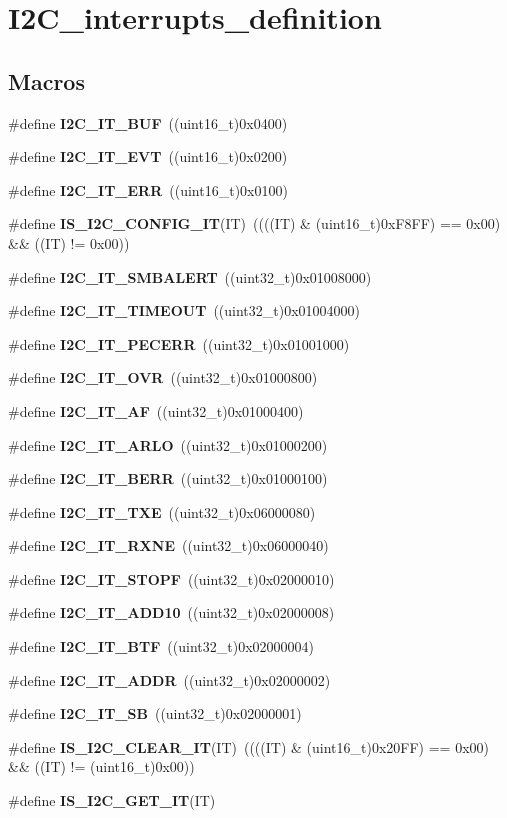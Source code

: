\section{I2\+C\+\_\+interrupts\+\_\+definition}
\label{group__I2C__interrupts__definition}
\subsection*{Macros}
\begin{DoxyCompactItemize}
\item 
\#define \textbf{ I2\+C\+\_\+\+I\+T\+\_\+\+B\+UF}~((uint16\+\_\+t)0x0400)
\item 
\#define \textbf{ I2\+C\+\_\+\+I\+T\+\_\+\+E\+VT}~((uint16\+\_\+t)0x0200)
\item 
\#define \textbf{ I2\+C\+\_\+\+I\+T\+\_\+\+E\+RR}~((uint16\+\_\+t)0x0100)
\item 
\#define \textbf{ I\+S\+\_\+\+I2\+C\+\_\+\+C\+O\+N\+F\+I\+G\+\_\+\+IT}(IT)~((((IT) \& (uint16\+\_\+t)0x\+F8\+F\+F) == 0x00) \&\& ((\+I\+T) != 0x00))
\item 
\#define \textbf{ I2\+C\+\_\+\+I\+T\+\_\+\+S\+M\+B\+A\+L\+E\+RT}~((uint32\+\_\+t)0x01008000)
\item 
\#define \textbf{ I2\+C\+\_\+\+I\+T\+\_\+\+T\+I\+M\+E\+O\+UT}~((uint32\+\_\+t)0x01004000)
\item 
\#define \textbf{ I2\+C\+\_\+\+I\+T\+\_\+\+P\+E\+C\+E\+RR}~((uint32\+\_\+t)0x01001000)
\item 
\#define \textbf{ I2\+C\+\_\+\+I\+T\+\_\+\+O\+VR}~((uint32\+\_\+t)0x01000800)
\item 
\#define \textbf{ I2\+C\+\_\+\+I\+T\+\_\+\+AF}~((uint32\+\_\+t)0x01000400)
\item 
\#define \textbf{ I2\+C\+\_\+\+I\+T\+\_\+\+A\+R\+LO}~((uint32\+\_\+t)0x01000200)
\item 
\#define \textbf{ I2\+C\+\_\+\+I\+T\+\_\+\+B\+E\+RR}~((uint32\+\_\+t)0x01000100)
\item 
\#define \textbf{ I2\+C\+\_\+\+I\+T\+\_\+\+T\+XE}~((uint32\+\_\+t)0x06000080)
\item 
\#define \textbf{ I2\+C\+\_\+\+I\+T\+\_\+\+R\+X\+NE}~((uint32\+\_\+t)0x06000040)
\item 
\#define \textbf{ I2\+C\+\_\+\+I\+T\+\_\+\+S\+T\+O\+PF}~((uint32\+\_\+t)0x02000010)
\item 
\#define \textbf{ I2\+C\+\_\+\+I\+T\+\_\+\+A\+D\+D10}~((uint32\+\_\+t)0x02000008)
\item 
\#define \textbf{ I2\+C\+\_\+\+I\+T\+\_\+\+B\+TF}~((uint32\+\_\+t)0x02000004)
\item 
\#define \textbf{ I2\+C\+\_\+\+I\+T\+\_\+\+A\+D\+DR}~((uint32\+\_\+t)0x02000002)
\item 
\#define \textbf{ I2\+C\+\_\+\+I\+T\+\_\+\+SB}~((uint32\+\_\+t)0x02000001)
\item 
\#define \textbf{ I\+S\+\_\+\+I2\+C\+\_\+\+C\+L\+E\+A\+R\+\_\+\+IT}(IT)~((((IT) \& (uint16\+\_\+t)0x20\+F\+F) == 0x00) \&\& ((\+I\+T) != (uint16\+\_\+t)0x00))
\item 
\#define \textbf{ I\+S\+\_\+\+I2\+C\+\_\+\+G\+E\+T\+\_\+\+IT}(IT)
\end{DoxyCompactItemize}


